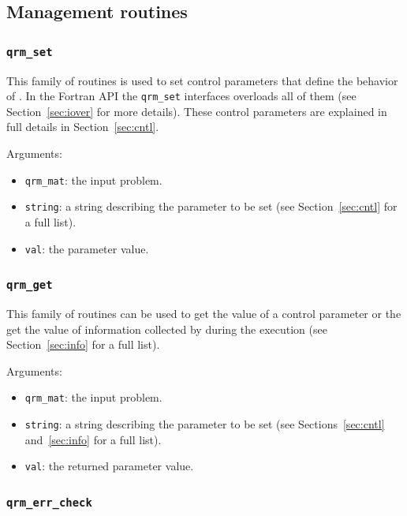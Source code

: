 \documentclass[11pt]{article}
\begin{document}
\subsection{Management routines}
\label{sec:mgmt}

\subsubsection{\texttt{qrm\_set}}
\label{sec:set}
This family of routines is used to set control parameters that define
the behavior of \qrm. In the Fortran API the \texttt{qrm\_set}
interfaces overloads all of them (see Section~\ref{sec:iover} for more
details). These control parameters are explained in full details in
Section~\ref{sec:cntl}.


\noindent Arguments:
\begin{itemize}
\item \texttt{qrm\_mat}: the input problem.
\item \texttt{string}: a string describing the parameter to be set
  (see Section~\ref{sec:cntl} for a full list).
\item \texttt{val}: the parameter value.
\end{itemize}

\subsubsection{\texttt{qrm\_get}}
\label{sec:get}
This family of routines can be used to get the value of a control
parameter or the get the value of information collected by \qrm during
the execution (see Section~\ref{sec:info} for a full list). 

\noindent Arguments:
\begin{itemize}
\item \texttt{qrm\_mat}: the input problem.
\item \texttt{string}: a string describing the parameter to be set
  (see Sections~\ref{sec:cntl} and~\ref{sec:info} for a full list).
\item \texttt{val}: the returned parameter value.
\end{itemize}



\subsubsection{\texttt{qrm\_err\_check}}
\end{document}
